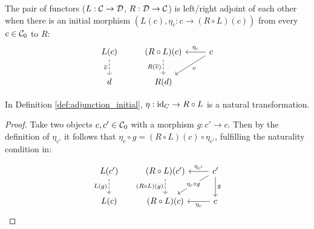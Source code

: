 \begin{definition}
  The pair of functors ($L: \mathcal{C}\to \mathcal{D}$, $R: \mathcal{D}\to \mathcal{C}$) is left/right adjoint of
  each other when there is an initial morphism $(L(c), \eta_c:c\to (R\circ
  L)(c))$ from every $c\in \mathcal{C}_0$ to $R$:
  \parencite{awodey:category_theory}
  \[\begin{tikzcd}[ampersand replacement=\&]
    {L(c)} \& {(R\circ L)(c)} \& c \\
    d \& {R(d)}
    \arrow["{\overline{v}}"', dashed, from=1-1, to=2-1]
    \arrow["{R(\overline{v})}"', dashed, from=1-2, to=2-2]
    \arrow["v", from=1-3, to=2-2]
    \arrow["{\eta_c}"', from=1-3, to=1-2]
  \end{tikzcd}\]
\end{definition}

\begin{theorem}
  In Definition \ref{def:adjunction_initial}, $\eta:\mathrm{id}_C \to R\circ L$ is a
  natural transformation.

  \begin{proof}
    Take two objects $c,c'\in \mathcal{C}_0$ with a morphism $g:c'\to c$. Then by the
    definition of $\eta_{c'}$ it follows that $\eta_c\circ g = (R\circ
    L)(c)\circ \eta_{c'}$, fulfilling the naturality condition in:

    \[\begin{tikzcd}[ampersand replacement=\&]
      {L(c')} \& {(R\circ L)(c')} \& {c'} \\
      {L(c)} \& {(R\circ L)(c)} \& c
      \arrow["{\eta_c}", from=2-3, to=2-2]
      \arrow["{\eta_{c'}}"', from=1-3, to=1-2]
      \arrow["g", from=1-3, to=2-3]
      \arrow["{(R\circ L)(g)}"', dashed, from=1-2, to=2-2]
      \arrow["{L(g)}"', dashed, from=1-1, to=2-1]
      \arrow["{\eta_c\circ g}"{description}, from=1-3, to=2-2]
    \end{tikzcd}\]
  \end{proof}
\end{theorem}

